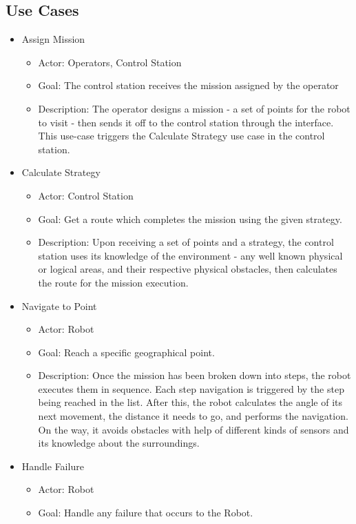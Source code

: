\subsection{Use Cases}
\begin{itemize}
    \item Assign Mission
\begin{itemize}
    \item Actor: Operators, Control Station
    \item Goal: The control station receives the mission assigned by the operator
    \item Description: The operator designs a mission - a set of points for the robot to visit - then sends it off to the control station through the interface. This use-case triggers the Calculate Strategy use case in the control station.
\end{itemize}
\item Calculate Strategy
\begin{itemize}
    \item Actor: Control Station
    \item Goal: Get a route which completes the mission using the given strategy.
    \item Description: Upon receiving a set of points and a strategy, the control station uses its knowledge of the environment - any well known physical or logical areas, and their respective physical obstacles, then calculates the route for the mission execution.
\end{itemize}
\item Navigate to Point
\begin{itemize}
    \item Actor: Robot
    \item Goal: Reach a specific geographical point.
    \item Description: Once the mission has been broken down into steps, the robot executes them in sequence. Each step navigation is triggered by the step being reached in the list. After this, the robot calculates the angle of its next movement, the distance it needs to go, and performs the navigation. On the way, it avoids obstacles with help of different kinds of sensors and its knowledge about the surroundings.
\end{itemize}
\item Handle Failure
\begin{itemize}
    \item Actor: Robot
    \item Goal: Handle any failure that occurs to the Robot.

\end{itemize}
\end{itemize}
